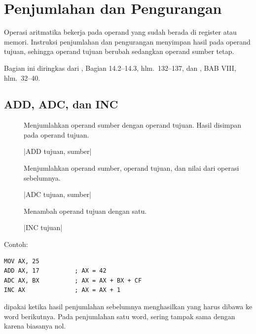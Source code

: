\section{Penjumlahan dan Pengurangan}
\label{sec:penjumlahan-pengurangan}

Operasi aritmatika bekerja pada operand yang sudah berada di register
atau memori. Instruksi penjumlahan dan pengurangan menyimpan hasil
pada operand tujuan, sehingga operand tujuan berubah sedangkan
operand sumber tetap.

Bagian ini diringkas dari \cite{gunawan2019}, Bagian 14.2--14.3,
hlm.~132--137, dan \cite{sto2001}, BAB VIII, hlm.~32--40.

\subsection{ADD, ADC, dan INC}

\begin{description}
    \item[] Menjumlahkan operand sumber dengan operand
          tujuan. Hasil disimpan pada operand tujuan.
          \begin{center}
          \lstasm|ADD tujuan, sumber|
          \end{center}

    \item[] Menjumlahkan operand sumber, operand tujuan,
          dan nilai  dari operasi sebelumnya.
          \begin{center}
          \lstasm|ADC tujuan, sumber|
          \end{center}

    \item[] Menambah operand tujuan dengan satu.
          \begin{center}
          \lstasm|INC tujuan|
          \end{center}
\end{description}

Contoh:

\begin{lstlisting}[language=MASM, numbers=none]
MOV AX, 25
ADD AX, 17          ; AX = 42
ADC AX, BX          ; AX = AX + BX + CF
INC AX              ; AX = AX + 1
\end{lstlisting}

 dipakai ketika hasil penjumlahan sebelumnya menghasilkan
 yang harus dibawa ke word berikutnya. Pada penjumlahan
satu word,  sering tampak sama dengan  karena
 biasanya nol.


